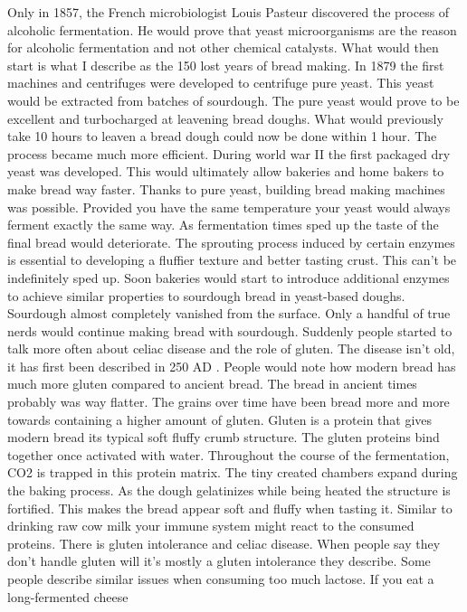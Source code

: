 Only in 1857, the French microbiologist Louis Pasteur discovered
the process of alcoholic fermentation. He would prove that
yeast microorganisms are the reason for alcoholic fermentation
and not other chemical catalysts. What would then start is
what I describe as the 150 lost years of bread making. In 1879
the first machines and centrifuges were developed to centrifuge
pure yeast. This yeast would be extracted from batches of sourdough.
The pure yeast would prove to be excellent and turbocharged
at leavening bread doughs. What would previously take 10 hours
to leaven a bread dough could now be done within 1 hour.
The process became much more efficient. During world war II
the first packaged dry yeast was developed. This would ultimately
allow bakeries and home bakers to make bread way faster.
Thanks to pure yeast, building bread making machines was
possible. Provided you have the same temperature your yeast
would always ferment exactly the same way. As fermentation
times sped up the taste of the final bread would deteriorate.
The sprouting process induced by certain enzymes is essential
to developing a fluffier texture and better tasting crust. This
can't be indefinitely sped up. Soon bakeries would start
to introduce additional enzymes to achieve similar properties
to sourdough bread in yeast-based doughs. Sourdough almost
completely vanished from the surface. Only a handful
of true nerds would continue making bread with sourdough.
Suddenly people started to talk more often about celiac disease
and the role of gluten. The disease isn't old, it has first
been described in 250 AD \cite{coeliac+disease}. People
would note how modern bread has much more gluten compared
to ancient bread. The bread in ancient times probably was way flatter.
The grains over time have been bread more and more towards containing a higher
amount of gluten. Gluten is a protein that gives modern
bread its typical soft fluffy crumb structure. The
gluten proteins bind together once activated with water.
Throughout the course of the fermentation, CO2 is trapped
in this protein matrix. The tiny created chambers expand
during the baking process. As the dough gelatinizes while
being heated the structure is fortified. This makes the bread appear
soft and fluffy when tasting it. Similar to drinking
raw cow milk your immune system might react to
the consumed proteins. There is gluten intolerance
and celiac disease. When people say they don't handle
gluten will it's mostly a gluten intolerance they describe.
Some people describe similar issues when consuming
too much lactose. If you eat a long-fermented cheese
